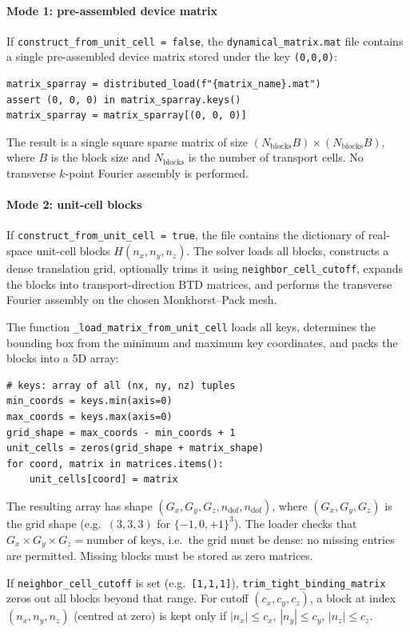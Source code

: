 \paragraph{Mode 1: pre-assembled device matrix}
If \texttt{construct\_from\_unit\_cell = false}, the
\texttt{dynamical\_matrix.mat} file contains a single pre-assembled
device matrix stored under the key \texttt{(0,0,0)}:
\begin{lstlisting}
matrix_sparray = distributed_load(f"{matrix_name}.mat")
assert (0, 0, 0) in matrix_sparray.keys()
matrix_sparray = matrix_sparray[(0, 0, 0)]
\end{lstlisting}
The result is a single square sparse matrix of size
$(N_\mathrm{blocks}B)\times(N_\mathrm{blocks}B)$, where $B$ is the block size and
$N_\mathrm{blocks}$ is the number of transport cells.  No transverse
$k$-point Fourier assembly is performed.

\paragraph{Mode 2: unit-cell blocks}
If \texttt{construct\_from\_unit\_cell = true}, the file contains the
dictionary of real-space unit-cell blocks
$H(n_x,n_y,n_z)$.  The solver loads all blocks, constructs a dense
translation grid, optionally trims it using
\texttt{neighbor\_cell\_cutoff}, expands the blocks into
transport-direction BTD matrices, and performs the transverse
Fourier assembly on the chosen Monkhorst--Pack mesh.

The function \texttt{\_load\_matrix\_from\_unit\_cell} loads all keys,
determines the bounding box from the minimum and maximum key
coordinates, and packs the blocks into a 5D array:
\begin{lstlisting}
# keys: array of all (nx, ny, nz) tuples
min_coords = keys.min(axis=0)
max_coords = keys.max(axis=0)
grid_shape = max_coords - min_coords + 1
unit_cells = zeros(grid_shape + matrix_shape)
for coord, matrix in matrices.items():
    unit_cells[coord] = matrix
\end{lstlisting}
The resulting array has shape
$(G_x,G_y,G_z,n_\mathrm{dof},n_\mathrm{dof})$, where
$(G_x,G_y,G_z)$ is the grid shape (e.g.\ $(3,3,3)$ for
$\{-1,0,+1\}^3$).  The loader checks that
$G_x \times G_y \times G_z = \text{number of keys}$, i.e.\ the grid
must be dense: no missing entries are permitted.  Missing blocks must
be stored as zero matrices.

If \texttt{neighbor\_cell\_cutoff} is set (e.g.\ \texttt{[1,1,1]}),
\texttt{trim\_tight\_binding\_matrix} zeros out all blocks beyond that
range.  For cutoff $(c_x,c_y,c_z)$, a block at index
$(n_x,n_y,n_z)$ (centred at zero) is kept only if
$|n_x| \le c_x$, $|n_y| \le c_y$, $|n_z| \le c_z$.

